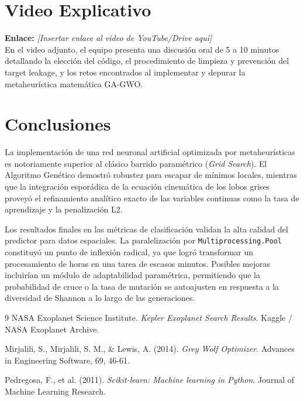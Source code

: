 \documentclass[12pt, letterpaper]{article}
\begin{document}
\section{Video Explicativo}
\textbf{Enlace:} \textit{[Insertar enlace al video de YouTube/Drive aquí]}\\

En el video adjunto, el equipo presenta una discusión oral de 5 a 10 minutos detallando la elección del código, el procedimiento de limpieza y prevención del target leakage, y los retos encontrados al implementar y depurar la metaheurística matemática GA-GWO.

\section{Conclusiones}
La implementación de una red neuronal artificial optimizada por metaheurísticas es notoriamente superior al clásico barrido paramétrico (\textit{Grid Search}). El Algoritmo Genético demostró robustez para escapar de mínimos locales, mientras que la integración esporádica de la ecuación cinemática de los lobos grises proveyó el refinamiento analítico exacto de las variables continuas como la tasa de aprendizaje y la penalización L2.

Los resultados finales en las métricas de clasificación validan la alta calidad del predictor para datos espaciales. La paralelización por \texttt{Multiprocessing.Pool} constituyó un punto de inflexión radical, ya que logró transformar un procesamiento de horas en una tarea de escasos minutos. Posibles mejoras incluirían un módulo de adaptabilidad paramétrica, permitiendo que la probabilidad de cruce o la tasa de mutación se autoajusten en respuesta a la diversidad de Shannon a lo largo de las generaciones.

\newpage
\begin{thebibliography}{9}
NASA Exoplanet Science Institute. 
\emph{Kepler Exoplanet Search Results}. Kaggle / NASA Exoplanet Archive.

Mirjalili, S., Mirjalili, S. M., \& Lewis, A. (2014). 
\emph{Grey Wolf Optimizer}. Advances in Engineering Software, 69, 46-61.

Pedregosa, F., et al. (2011). 
\emph{Scikit-learn: Machine learning in Python}. Journal of Machine Learning Research.
\end{thebibliography}
\end{document}
